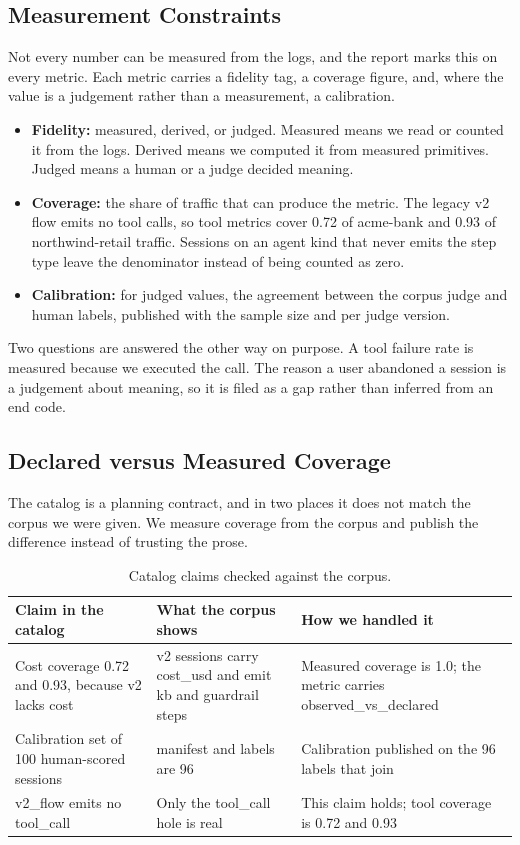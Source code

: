 \documentclass[8pt,twocolumn,a4paper]{extarticle}
\begin{document}
\subsection{Measurement Constraints}

Not every number can be measured from the logs, and the report marks
this on every metric. Each metric carries a fidelity tag, a coverage
figure, and, where the value is a judgement rather than a measurement, a
calibration.

\begin{itemize}
    \item \textbf{Fidelity:} measured, derived, or judged. Measured means
    we read or counted it from the logs. Derived means we computed it
    from measured primitives. Judged means a human or a judge decided
    meaning.
    \item \textbf{Coverage:} the share of traffic that can produce the
    metric. The legacy v2 flow emits no tool calls, so tool metrics cover
    0.72 of acme-bank and 0.93 of northwind-retail traffic. Sessions on
    an agent kind that never emits the step type leave the denominator
    instead of being counted as zero.
    \item \textbf{Calibration:} for judged values, the agreement between
    the corpus judge and human labels, published with the sample size and
    per judge version.
\end{itemize}

Two questions are answered the other way on purpose. A tool failure rate
is measured because we executed the call. The reason a user abandoned a
session is a judgement about meaning, so it is filed as a gap rather
than inferred from an end code.

\subsection{Declared versus Measured Coverage}

The catalog is a planning contract, and in two places it does not match
the corpus we were given. We measure coverage from the corpus and
publish the difference instead of trusting the prose.

\begin{table}[t]
\centering
\caption{Catalog claims checked against the corpus.}
\label{tab:drift}
\small
\begin{tabular}{p{}p{}p{}}
\toprule
\textbf{Claim in the catalog} & \textbf{What the corpus shows} & \textbf{How we handled it} \\
\midrule
Cost coverage 0.72 and 0.93, because v2 lacks cost & v2 sessions carry cost\_usd and emit kb and guardrail steps & Measured coverage is 1.0; the metric carries observed\_vs\_declared \\
Calibration set of 100 human-scored sessions & manifest and labels are 96 & Calibration published on the 96 labels that join \\
v2\_flow emits no tool\_call & Only the tool\_call hole is real & This claim holds; tool coverage is 0.72 and 0.93 \\
\bottomrule
\end{tabular}
\end{table}
\end{document}
